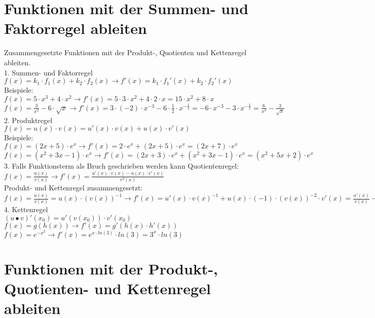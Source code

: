 \documentclass[a4paper]{article}
\begin{document}
\section{Funktionen mit der Summen- und Faktorregel ableiten}
Zusammengesetzte Funktionen mit der Produkt-, Quotienten und Kettenregel ableiten. \\ 
1. Summen- und Faktorregel \\
$f(x) = k_1 \cdot f_1(x) + k_2 \cdot f_2(x) \longrightarrow f'(x) = k_1 \cdot f_1'(x) + k_2 \cdot f_2'(x) $ \\
Beispiele: \\
$f(x) = 5 \cdot x^3 + 4 \cdot x^2 \longrightarrow f'(x) = 5 \cdot 3 \cdot x^2 + 4 \cdot 2 \cdot x = 15 \cdot x^2 + 8 \cdot x$ \\
$f(x) = \frac{3}{x^2} - 6 \cdot \sqrt{x} \longrightarrow f'(x) = 3 \cdot (-2) \cdot x^{-3} - 6 \cdot \frac{1}{2} \cdot x^{-\frac{1}{2}} = - 6 \cdot x^{-3} - 3 \cdot x^{-\frac{1}{2}} = \frac{6}{x^3} - \frac{3}{\sqrt{x}}  $ \\
2. Produktregel \\
$f(x) = u(x) \cdot v(x) = u'(x) \cdot v(x) + u(x) \cdot v'(x) $ \\
Beispiele: \\ 
$f(x) = (2x+5) \cdot e^x \longrightarrow f'(x) = 2 \cdot e^x + (2x+5) \cdot e^x = (2x + 7) \cdot e^x $
$f(x) = (x^2 + 3x - 1) \cdot e^x \longrightarrow f'(x) = (2x+3) \cdot e^x + (x^2 + 3x -1) \cdot e^x = (x^2 + 5x +2) \cdot e^x $ \\ 
3. Falls Funktionsterm als Bruch geschrieben werden kann \textrightarrow  Quotientenregel: \\
$f(x) = \frac{u(x)}{v(x)} \longrightarrow f'(x) = \frac{u'(x) \cdot v(x) - u(x) \cdot v'(x)}{v^2(x)}$ \\ 
Produkt- und Kettenregel zusammengesetzt: \\
$f(x) = \frac{u(x)}{v(x)} = u(x) \cdot (v(x))^{-1} \longrightarrow 
f'(x) = u'(x) \cdot v(x)^{-1} + u(x) \cdot (-1) \cdot (v(x))^{-2} \cdot v'(x) = \frac{u'(x)}{v(x)} - \frac{u(x) \cdot v'(x)}{v^2(x)} = \frac{u'(x) \cdot v(x) - u(x) \cdot v'(x)}{v^2(x)} $ \\ 
4. Kettenregel \\
$(u\bullet v)'(x_0) = u'(v(x_0)) \cdot v'(x_0)$ \\ 
$f(x) = g(h(x)) \longrightarrow f'(x) = g'(h(x) \cdot h'(x))$
$f(x) = e^{-x^2} \longrightarrow f'(x) = e^{x \cdot ln(3)} \cdot ln(3) = 3^x \cdot ln(3) $
\section{Funktionen mit der Produkt-, Quotienten- und Kettenregel ableiten}
\end{document}
